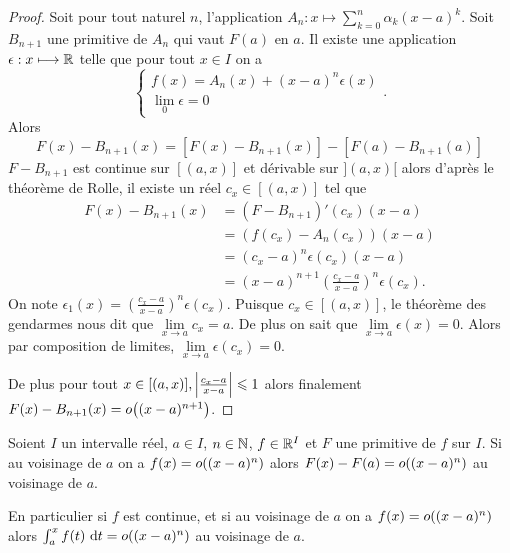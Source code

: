 \begin{proof}
  Soit pour tout naturel \(n\), l'application \(A_n : x \longmapsto \sum_{k = 0}^n 
  \alpha_k(x-a)^k\). Soit \(B_{n+1}\) une primitive de \(A_n\) qui vaut \(F(a)\) 
  en \(a\). Il existe une application \(\epsilon: x \longmapsto \mathbb{R}\) telle que 
  pour tout \(x \in I\) on a
  \begin{equation}
    \begin{cases}
      f(x) = A_n(x)+(x-a)^n\epsilon(x) \\
      \lim\limits_{0} \epsilon = 0
    \end{cases}.
  \end{equation}
  Alors
  \begin{equation}
    F(x) - B_{n+1}(x) = [F(x)-B_{n+1}(x)] - [F(a)-B_{n+1}(a)]
  \end{equation}
  \(F-B_{n+1}\) est continue sur \([(a,x)]\) et dérivable sur \(](a,x)[\) alors 
  d'après le théorème de Rolle, il existe un réel \(c_x \in [(a,x)]\) tel que
  \begin{align*}
    F(x)-B_{n+1}(x) &= (F-B_{n+1})'(c_x)(x-a)\\
    & = (f(c_x)-A_n(c_x))(x-a)\\
    & = (c_x-a)^n\epsilon(c_x)(x-a)\\
    & = (x-a)^{n+1} \left(\frac{c_x-a}{x-a}\right)^n \epsilon(c_x).
  \end{align*}
  On note \(\epsilon_1(x) = \left(\frac{c_x-a}{x-a}\right)^n \epsilon(c_x)\). 
  Puisque \(c_x \in [(a,x)]\), le théorème des gendarmes nous dit que 
  \(\lim\limits_{x \to a} c_x =a\). De plus on sait que \(\lim\limits_{x \to 
  a}\epsilon(x) = 0\). Alors par composition de limites, \(\lim\limits_{x \to a} 
  \epsilon(c_x) = 0\). 

  De plus pour tout \(x \in [(a,x)], \left\lvert\frac{c_x-a}{x-a}\right\rvert \leqslant 1\) alors 
  finalement \(F(x)-B_{n+1}(x) = o\mathopen{}\left((x-a)^{n+1}\right)\).
\end{proof}

\begin{corth}
  Soient \(I\) un intervalle réel, \(a \in I\), \(n \in \mathbb{N}\), \(f \in \mathbb{R}^I\) et 
  \(F\) une primitive de \(f\) sur \(I\). Si au voisinage de \(a\) on a 
  \(f(x) = o\mathopen{}\left((x-a)^n\right)\) alors \(F(x)-F(a) = o\mathopen{}\left((x-a)^n\right)\) au voisinage de 
  \(a\). 

En particulier si \(f\) est continue, et si au voisinage de \(a\) on a  
\(f(x) = o\mathopen{}\left((x-a)^n\right)\) alors \(\int_a^x f(t)\,\mathop{}\mathopen{}\mathrm{d} t = o\mathopen{}\left((x-a)^n\right)\) au 
voisinage de \(a\). \end{corth}

